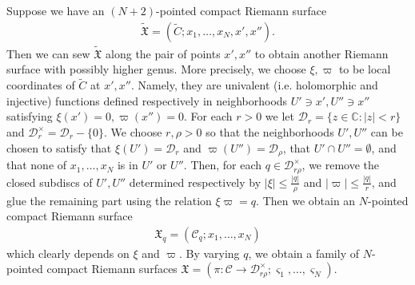 \documentclass[12pt,a4paper,notitlepage]{report}
\theoremstyle{definition}
\theoremstyle{plain}
\newcommand{\fk}{\mathfrak}
\newcommand{\mc}{\mathcal}
\newcommand{\wtd}{\widetilde}
\newcommand{\sgm}{\varsigma}
\newcommand{\Cbb}{\mathbb C}
\numberwithin{equation}{section}
\begin{document}
Suppose  we have an $(N+2)$-pointed compact Riemann surface
\begin{align*}
\wtd{\fk X}=(\wtd C;x_1,\dots,x_N,x',x'').
\end{align*}
Then we can sew $\wtd{\fk X}$ along the pair of points $x',x''$ to obtain another Riemann surface with possibly higher genus. More precisely, we choose $\xi,\varpi$ to be local coordinates of $\wtd C$ at $x',x''$. Namely, they are univalent  (i.e. holomorphic and injective) functions defined respectively in neighborhoods $U'\ni x',U''\ni x''$ satisfying $\xi(x')=0,\varpi(x'')=0$. For each $r>0$ we let $\mc D_r=\{z\in\Cbb:|z|<r\}$ and $\mc D_r^\times=\mc D_r-\{0\}$. We choose $r,\rho>0$ so that the neighborhoods $U',U''$ can be chosen to satisfy that $\xi(U')=\mc D_r$ and $\varpi(U'')=\mc D_\rho$, that  $U'\cap U''=\emptyset$, and that none of $x_1,\dots,x_N$ is in $U'$ or $U''$. Then, for each $q\in\mc D_{r\rho}^\times$, we remove the closed subdiscs of $U',U''$ determined respectively by $|\xi|\leq \frac {|q|}\rho$ and $|\varpi|\leq \frac{|q|}r$, and glue the remaining part using the relation $\xi\varpi=q$. Then we obtain an $N$-pointed compact Riemann surface
\begin{align*}
\fk X_q=(\mc C_q;x_1,\dots,x_N)
\end{align*}
which clearly depends on $\xi$ and $\varpi$. By varying $q$, we obtain a family of $N$-pointed compact Riemann surfaces $\fk X=(\pi:\mc C\rightarrow\mc D_{r\rho}^\times;\sgm_1,\dots,\sgm_N)$.
\end{document}
